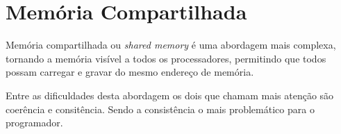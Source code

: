 \section{Memória Compartilhada}

Memória compartilhada ou \textit{shared memory} é uma abordagem mais complexa, 
tornando a memória visível a todos os processadores, permitindo que 
todos possam carregar e gravar do mesmo endereço de memória. 

Entre as dificuldades desta abordagem os dois que chamam mais atenção são
coerência e consitência.
Sendo a consistência o mais problemático para o programador.





